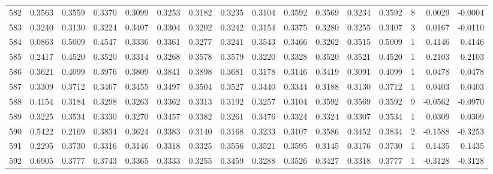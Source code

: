 \begin{tabular}{lrrrrrrrrrrrrrrr}
582 &      0.3563 &  0.3559 &  0.3370 &  0.3099 &  0.3253 &  0.3182 &  0.3235 &  0.3104 &  0.3592 &  0.3569 &   0.3234 &     0.3592 &      8 &                    0.0029 &                    -0.0004 \\
583 &      0.3240 &  0.3130 &  0.3224 &  0.3407 &  0.3304 &  0.3202 &  0.3242 &  0.3154 &  0.3375 &  0.3280 &   0.3255 &     0.3407 &      3 &                    0.0167 &                    -0.0110 \\
584 &      0.0863 &  0.5009 &  0.4547 &  0.3336 &  0.3361 &  0.3277 &  0.3241 &  0.3543 &  0.3466 &  0.3262 &   0.3515 &     0.5009 &      1 &                    0.4146 &                     0.4146 \\
585 &      0.2417 &  0.4520 &  0.3520 &  0.3314 &  0.3268 &  0.3578 &  0.3579 &  0.3220 &  0.3328 &  0.3520 &   0.3521 &     0.4520 &      1 &                    0.2103 &                     0.2103 \\
586 &      0.3621 &  0.4099 &  0.3976 &  0.3809 &  0.3841 &  0.3898 &  0.3681 &  0.3178 &  0.3146 &  0.3419 &   0.3091 &     0.4099 &      1 &                    0.0478 &                     0.0478 \\
587 &      0.3309 &  0.3712 &  0.3467 &  0.3455 &  0.3497 &  0.3504 &  0.3527 &  0.3440 &  0.3344 &  0.3188 &   0.3130 &     0.3712 &      1 &                    0.0403 &                     0.0403 \\
588 &      0.4154 &  0.3184 &  0.3298 &  0.3263 &  0.3362 &  0.3313 &  0.3192 &  0.3257 &  0.3104 &  0.3592 &   0.3569 &     0.3592 &      9 &                   -0.0562 &                    -0.0970 \\
589 &      0.3225 &  0.3534 &  0.3330 &  0.3270 &  0.3457 &  0.3382 &  0.3261 &  0.3476 &  0.3324 &  0.3324 &   0.3307 &     0.3534 &      1 &                    0.0309 &                     0.0309 \\
590 &      0.5422 &  0.2169 &  0.3834 &  0.3624 &  0.3383 &  0.3140 &  0.3168 &  0.3233 &  0.3107 &  0.3586 &   0.3452 &     0.3834 &      2 &                   -0.1588 &                    -0.3253 \\
591 &      0.2295 &  0.3730 &  0.3316 &  0.3146 &  0.3318 &  0.3325 &  0.3556 &  0.3521 &  0.3595 &  0.3145 &   0.3176 &     0.3730 &      1 &                    0.1435 &                     0.1435 \\
592 &      0.6905 &  0.3777 &  0.3743 &  0.3365 &  0.3333 &  0.3255 &  0.3459 &  0.3288 &  0.3526 &  0.3427 &   0.3318 &     0.3777 &      1 &                   -0.3128 &                    -0.3128 \\

\end{tabular}
